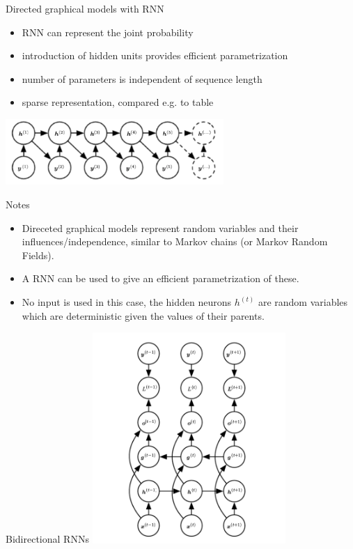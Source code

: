 \begin{frame}{Directed graphical models with RNN}
\begin{itemize}
\item RNN can represent the joint probability 
\item introduction of hidden units provides efficient parametrization
\item number of parameters is independent of sequence length
\item sparse representation, compared e.g. to table 
\end{itemize}
\vspace{1em}
\includegraphics[height=2.5cm]{data/graph_model_2.png}
\end{frame}

\begin{frame}[beamer:0]{Notes}
\begin{itemize}
\item Direceted graphical models represent random variables and their influences/independence, similar to Markov chains (or Markov Random Fields).
\item A RNN can be used to give an efficient parametrization of these.
\item No input is used in this case, the hidden neurons $h^{(t)}$ are random variables which are deterministic given the values of their parents. 
\end{itemize}
\end{frame}

\begin{frame}{Bidirectional RNNs}
\centering
\includegraphics[height=8cm]{data/bidirectional.png}
\end{frame}

